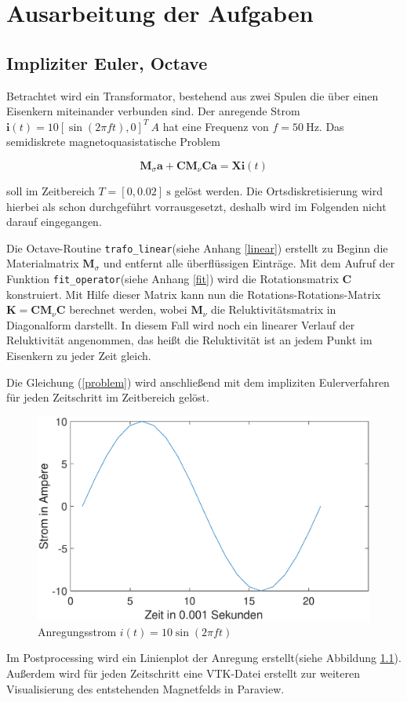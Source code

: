 \chapter{Ausarbeitung der Aufgaben}
\section{Impliziter Euler, Octave}
Betrachtet wird ein Transformator, bestehend aus zwei Spulen die über einen Eisenkern miteinander verbunden sind. Der anregende Strom $\textbf{i}(t) = 10[\sin(2\pi ft), 0]^T \SI{}{A}$ hat eine Frequenz von $ f = \SI{50}{\hertz}$. Das semidiskrete magnetoquasistatische Problem

\begin{equation}
	\textbf{M}_\sigma \textbf{\.{a}} + \textbf{\~{C}M}_\nu \textbf{Ca} = \textbf{Xi}(t)
	\label{problem}
\end{equation}

soll im Zeitbereich $T = [0, 0.02]\SI{}{\s}$ gelöst werden. Die Ortsdiskretisierung wird hierbei als schon durchgeführt vorrausgesetzt, deshalb wird im Folgenden nicht darauf eingegangen.

Die Octave-Routine \texttt{trafo\_linear}(siehe Anhang \ref{linear}) erstellt zu Beginn die Materialmatrix $\textbf{M}_\sigma$ und entfernt alle überflüssigen Einträge. Mit dem Aufruf der Funktion \texttt{fit\_operator}(siehe Anhang \ref{fit}) wird die Rotationsmatrix \textbf{C} konstruiert. Mit Hilfe dieser Matrix kann nun die Rotations-Rotations-Matrix $\textbf{K}= \textbf{\~{C}M}_\nu \textbf{C}$ berechnet werden, wobei $\textbf{M}_\nu$ die Reluktivitätsmatrix in Diagonalform darstellt. In diesem Fall wird noch ein linearer Verlauf der Reluktivität angenommen, das heißt die Reluktivität ist an jedem Punkt im Eisenkern zu jeder Zeit gleich.

Die Gleichung (\ref{problem}) wird anschließend mit dem impliziten Eulerverfahren für jeden Zeitschritt im Zeitbereich gelöst. 


\begin{figure}
	\includegraphics[width=\textwidth]{data/Strom}
	\caption{Anregungsstrom $i(t) = 10\sin(2\pi ft)$}
	\label{fig:Strom}
\end{figure}

Im Postprocessing wird ein Linienplot der Anregung erstellt(siehe Abbildung \ref{fig:Strom}). Außerdem wird für jeden Zeitschritt eine VTK-Datei erstellt zur weiteren Visualisierung des entstehenden Magnetfelds in Paraview.
